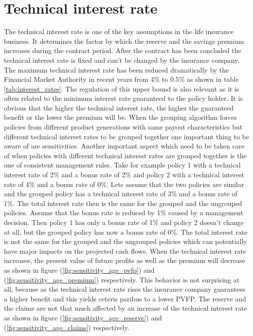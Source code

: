 \section{Technical interest rate}
\label{sec:technical_interest_rate} 
The technical interest rate is one of the key assumptions in the life insurance business. It determines the factor by which the reserve and the savings premium increases during the contract period. After the contract has been concluded the technical interest rate is fixed and can't be changed by the insurance company. The maximum technical interest rate has been reduced dramatically by the Financial Market Authority in recent years from 4\% to 0.5\% as shown in table \ref{tab:interest_rates}.  The regulation of this upper bound is also relevant as it is often related to the minimum interest rate guaranteed to the policy holder. It is obvious that the higher the  technical interest rate, the higher the guaranteed benefit or the lower the premium will be. When the grouping algorithm forces policies from different product generations with same payout characteristics but different technical interest rates to be grouped together one important thing to be aware of are sensitivities. Another important aspect which need to be taken care of when policies with different technical interest rates are grouped together is the one of consistent management rules.  Take for example policy 1 with a technical interest rate of 2\% and a bonus rate of 2\% and policy 2 with a technical interest rate of 4\% and a bonus rate of 0\%. Lets assume that the two policies are similar and the grouped policy has a technical interest rate of 3\% and a bonus rate of 1\%. The total interest rate then is the same for the grouped and the ungrouped policies. Assume that the bonus rate is reduced by 1\% caused by a management decision. Then policy 1 has only a bonus rate of 1\% and policy 2 doesn't change at all, but the grouped policy has now a bonus rate of 0\%. The total interest rate is not the same for the grouped and the ungrouped policies which can potentially have major impacts on the projected cash flows. When the technical interest rate increases, the present value of future profits as well as the premium will decrease as shown in figure (\ref{fig:sensitivity_age_pvfp}) and (\ref{fig:sensitivity_age_premium}) respectively. This behavior is not surprising at all, because as the technical interest rate rises the insurance company guarantees a higher benefit and this yields ceteris paribus to a lower PVFP. The reserve and the claims are not that much affected by an increase of the technical interest rate as shown in figure (\ref{fig:sensitivity_age_reserve}) and (\ref{fig:sensitivity_age_claims}) respectively.




